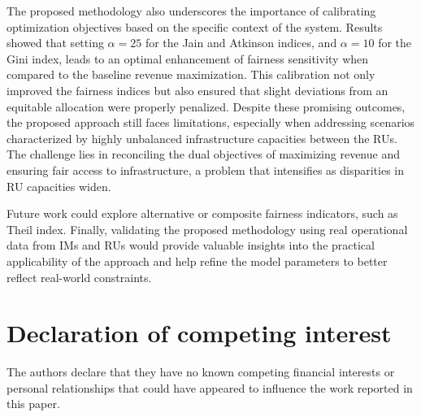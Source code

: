 \documentclass[preprint,12pt]{elsarticle}
\begin{document}
The proposed methodology also underscores the importance of calibrating optimization objectives based on the specific context of the system. Results showed that setting $\alpha=25$ for the Jain and Atkinson indices, and $\alpha=10$ for the Gini index, leads to an optimal enhancement of fairness sensitivity when compared to the baseline revenue maximization. This calibration not only improved the fairness indices but also ensured that slight deviations from an equitable allocation were properly penalized. Despite these promising outcomes, the proposed approach still faces limitations, especially when addressing scenarios characterized by highly unbalanced infrastructure capacities between the \glspl{RU}. The challenge lies in reconciling the dual objectives of maximizing revenue and ensuring fair access to infrastructure, a problem that intensifies as disparities in RU capacities widen.

Future work could explore alternative or composite fairness indicators, such as Theil index. Finally, validating the proposed methodology using real operational data from \glspl{IM} and \glspl{RU} would provide valuable insights into the practical applicability of the approach and help refine the model parameters to better reflect real-world constraints.



\section*{Declaration of competing interest}
The authors declare that they have no known competing financial interests or personal relationships that could have appeared to influence the work reported in this paper.


\end{document}
